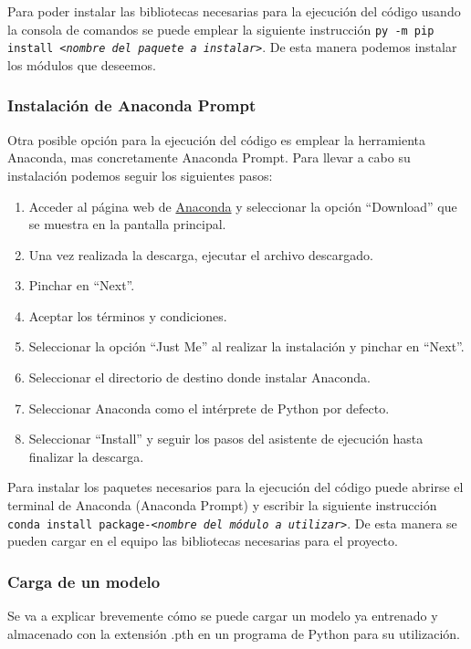 Para poder instalar las bibliotecas necesarias para la ejecución del código usando la consola de comandos se puede emplear la siguiente instrucción \texttt{py -m pip install \textit{<nombre del paquete a instalar>}}. De esta manera podemos instalar los módulos que deseemos.

\subsubsection{Instalación de Anaconda Prompt}

Otra posible opción para la ejecución del código es emplear la herramienta Anaconda, mas concretamente Anaconda Prompt. Para llevar a cabo su instalación podemos seguir los siguientes pasos:

\begin{enumerate}
    \item Acceder al página web de \href{https://www.anaconda.com/}{Anaconda} y seleccionar la opción ``Download'' que se muestra en la pantalla principal.
    \item Una vez realizada la descarga, ejecutar el archivo descargado.
    \item Pinchar en ``Next''.
    \item Aceptar los términos y condiciones.
    \item Seleccionar la opción ``Just Me'' al realizar la instalación y pinchar en ``Next''.
    \item Seleccionar el directorio de destino donde instalar Anaconda.
    \item Seleccionar Anaconda como el intérprete de Python por defecto.
    \item Seleccionar ``Install'' y seguir los pasos del asistente de ejecución hasta finalizar la descarga.
\end{enumerate}

Para instalar los paquetes necesarios para la ejecución del código puede abrirse el terminal de Anaconda (Anaconda Prompt) y escribir la siguiente instrucción \texttt{conda install package-\textit{<nombre del módulo a utilizar>}}. De esta manera se pueden cargar en el equipo las bibliotecas necesarias para el proyecto.

\subsubsection{Carga de un modelo}

Se va a explicar brevemente cómo se puede cargar un modelo ya entrenado y almacenado con la extensión .pth en un programa de Python para su utilización.

